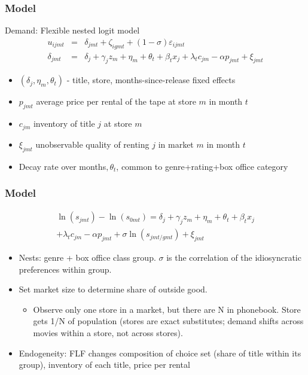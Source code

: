 \documentclass[notes=show]{beamer}
\begin{document}
\begin{frame}
\frametitle{Model}

Demand: Flexible nested logit model%
\begin{eqnarray*}
u_{ijmt} &=&\delta _{jmt}+\zeta _{igmt}+(1-\sigma )\varepsilon _{ijmt} \\
\delta _{jmt} &=&\delta _{j}+\gamma _{j}z_{m}+\eta _{m}+\theta _{t}+\beta
_{t}x_{j}+\lambda _{t}c_{jm}-\alpha p_{jmt}+\xi _{jmt}
\end{eqnarray*}

\begin{itemize}
\item $(\delta _{j},\eta _{m},\theta _{t})$ - title, store,
months-since-release fixed effects

\item $p_{jmt}$ average price per rental of the tape at store $m$ in month $%
t $

\item $c_{jm}$ inventory of title $j$ at store $m$

\item $\xi _{jmt}$ unobservable quality of renting $j$ in market $m$ in
month $t$

\item Decay rate over months$,\theta _{t}$, common to genre+rating+box
office category
\end{itemize}
\end{frame}


\begin{frame}
\frametitle{Model}%
\begin{eqnarray*}
\ln (s_{jmt}) -\ln (s_{0mt})=\delta _{j}+\gamma _{j}z_{m}+\eta _{m}+\theta
_{t}+\beta _{t}x_{j} \\
+ \lambda _{t}c_{jm}-\alpha p_{jmt}+\sigma \ln (s_{jmt/gmt})+\xi _{jmt}
\end{eqnarray*}

\begin{itemize}
\item Nests: genre + box office class group. $\sigma $ is the correlation of
the idiosyncratic preferences within group.

\item Set market size to determine share of outside good.

\begin{itemize}
\item Observe only one store in a market, but there are N in phonebook.
Store gets 1/N of population (stores are exact substitutes; demand
shifts across movies within a store, not across stores).
\end{itemize}

\item Endogeneity: FLF changes composition of choice set (share of title
within its group), inventory of each title, price per rental
\end{itemize}
\end{frame}
\end{document}
